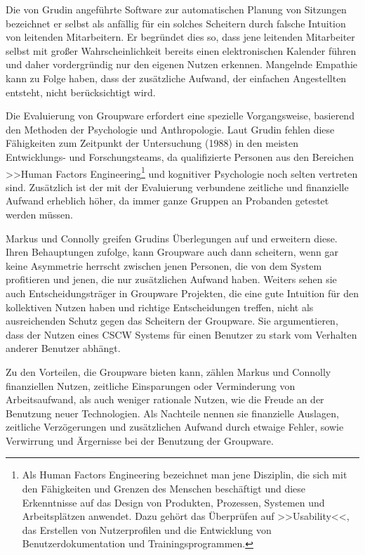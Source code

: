 Die von Grudin angeführte Software zur automatischen Planung von Sitzungen bezeichnet er selbst als anfällig für ein solches Scheitern durch falsche Intuition von leitenden Mitarbeitern. Er begründet dies so, dass jene leitenden Mitarbeiter selbst mit großer Wahrscheinlichkeit bereits einen elektronischen Kalender führen und daher vordergründig nur den eigenen Nutzen erkennen. Mangelnde Empathie kann zu Folge haben, dass der zusätzliche Aufwand, der einfachen Angestellten entsteht, nicht berücksichtigt wird.

\medskip Die Evaluierung von Groupware erfordert eine spezielle Vorgangsweise, basierend den Methoden der Psychologie und Anthropologie. Laut Grudin fehlen diese Fähigkeiten zum Zeitpunkt der Untersuchung (1988) in den meisten Entwicklungs- und Forschungsteams, da qualifizierte Personen aus den Bereichen >>Human Factors Engineering\footnote{Als Human Factors Engineering bezeichnet man jene Disziplin, die sich mit den Fähigkeiten und Grenzen des Menschen beschäftigt und diese Erkenntnisse auf das Design von Produkten, Prozessen, Systemen und Arbeitsplätzen anwendet. Dazu gehört das Überprüfen auf >>Usability<<, das Erstellen von Nutzerprofilen und die Entwicklung von Benutzerdokumentation und Trainingsprogrammen.} und kognitiver Psychologie noch selten vertreten sind. Zusätzlich ist der mit der Evaluierung verbundene zeitliche und finanzielle Aufwand erheblich höher, da immer ganze Gruppen an Probanden getestet werden müssen. \citep{Grudin:1988p126}

\medskip Markus und Connolly greifen Grudins Überlegungen auf und erweitern diese. Ihren Behauptungen zufolge, kann Groupware auch dann scheitern, wenn gar keine Asymmetrie herrscht zwischen jenen Personen, die von dem System profitieren und jenen, die nur zusätzlichen Aufwand haben. Weiters sehen sie auch Entscheidungsträger in Groupware Projekten, die eine gute Intuition für den kollektiven Nutzen haben und richtige Entscheidungen treffen, nicht als ausreichenden Schutz gegen das Scheitern der Groupware. Sie argumentieren, dass der Nutzen eines \ac{CSCW} Systems für einen Benutzer zu stark vom Verhalten anderer Benutzer abhängt. \citep{Markus:1990}

\medskip Zu den Vorteilen, die Groupware bieten kann, zählen Markus und Connolly finanziellen Nutzen, zeitliche Einsparungen oder Verminderung von Arbeitsaufwand, als auch weniger rationale Nutzen, wie die Freude an der Benutzung neuer Technologien. Als Nachteile nennen sie finanzielle Auslagen, zeitliche Verzögerungen und zusätzlichen Aufwand durch etwaige Fehler, sowie Verwirrung und Ärgernisse bei der Benutzung der Groupware. 

